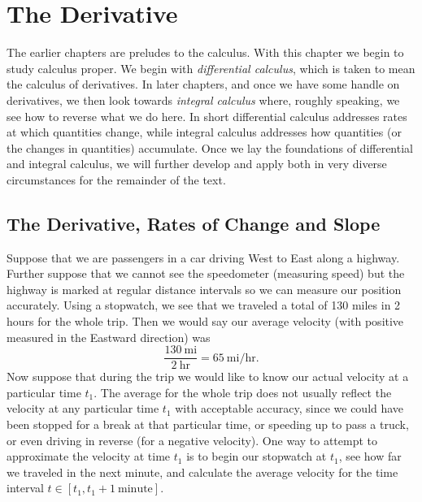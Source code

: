 \chapter{The Derivative\label{DerivativeChapter}}

The earlier chapters are preludes to the calculus.
With this chapter we begin to study calculus proper.
We begin with  {\it differential calculus},
which is taken to mean the calculus of derivatives.
In later chapters, and once we have some handle 
on derivatives, we then
look towards {\it integral calculus} where, roughly
speaking, we see how to reverse what we do here.\footnotemark
{}  In short  differential
calculus addresses rates at which quantities change, while integral
calculus addresses how quantities (or the changes in quantities) accumulate.
Once we lay the foundations of differential and integral
calculus, we will  further develop and apply
both in very diverse circumstances for the remainder of the text.


\section[Derivative, Rate of Change, and Slope]%
{The Derivative, Rates of Change and Slope
\label{DerivativeSection1}}

Suppose that we are passengers in a car driving West to East
along a highway.  Further suppose that we cannot see the
speedometer (measuring speed)  but the highway is marked
at regular distance intervals so we can measure our
position accurately.\footnotemark\hphantom{. }
  Using a stopwatch,
we see that we traveled a total of 130 miles in 2 hours
for the whole trip.  
Then we would say our average velocity (with positive
measured in the Eastward direction) was 
$$\frac{130\ \text{mi}}{2\ \text{hr}}=65\ {\text{mi}}/{\text{hr}}.$$
%
Now suppose that during the trip we would like to know our
actual  velocity
at a particular time $t_1$.  The average
for the whole trip does not usually reflect the velocity at
any particular time $t_1$ with acceptable
accuracy, since we could have been stopped
for a break at that particular time, or speeding up to 
pass a truck,  or even driving in reverse 
(for  a negative velocity).  One way to attempt to 
approximate the velocity at time $t_1$ is to begin
our stopwatch at $t_1$, see how far we traveled
in the next minute, and calculate the average
 velocity for the
time interval  $t\in[t_1,t_1+1\ \text{minute}]$.


